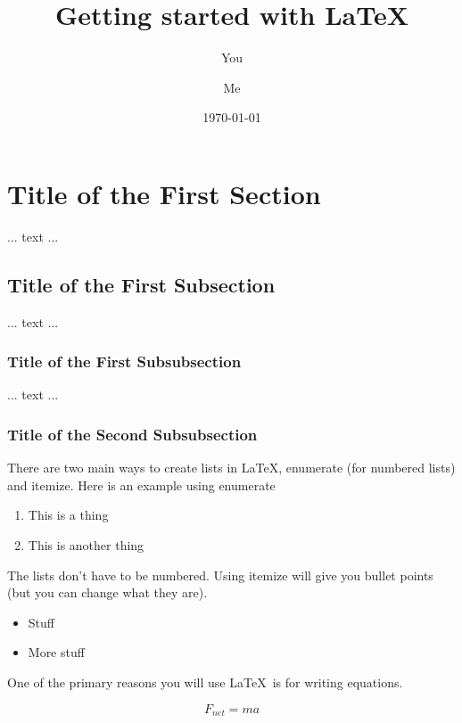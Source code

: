 \documentclass[a4paper]{article}
\begin{document}
\title{Getting started with LaTeX}
\author{You \and Me}
\date{\today}
\maketitle

\tableofcontents

\section{Title of the First Section}
... text ... 
\subsection{Title of the First Subsection}
... text ... 
\subsubsection{Title of the First Subsubsection}
... text ... 
\subsubsection*{Title of the Second Subsubsection} 

\newpage
There are two main ways to create lists in LaTeX, enumerate (for numbered lists) 
and itemize. Here is an example using enumerate 

\begin{enumerate}
\item This is a thing
\item This is another thing 
\end{enumerate}

The lists don't have to be numbered. Using itemize will give you bullet points 
(but you can change what they are). 
\begin{itemize}
\item Stuff
\item More stuff 
\end{itemize}

\newpage
One of the primary reasons you will use \LaTeX \ is for writing equations.  

\begin{equation}
F_{net}=ma
\end{equation}
\end{document}
